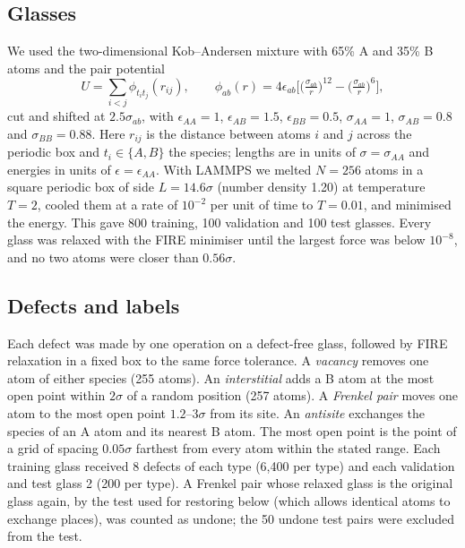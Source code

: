 \documentclass[11pt]{article}
\begin{document}
\subsection*{Glasses}
We used the two-dimensional Kob--Andersen mixture\citep{kob1995,bruning2009} with 65\% A and 35\% B atoms and the pair potential
\begin{equation}
U=\sum_{i<j}\phi_{t_it_j}(r_{ij}),\qquad \phi_{ab}(r)=4\epsilon_{ab}\Big[\big(\tfrac{\sigma_{ab}}{r}\big)^{12}-\big(\tfrac{\sigma_{ab}}{r}\big)^{6}\Big],
\label{eq:potential}
\end{equation}
cut and shifted at $2.5\sigma_{ab}$, with $\epsilon_{AA}=1$, $\epsilon_{AB}=1.5$, $\epsilon_{BB}=0.5$, $\sigma_{AA}=1$, $\sigma_{AB}=0.8$ and $\sigma_{BB}=0.88$. Here $r_{ij}$ is the distance between atoms $i$ and $j$ across the periodic box and $t_i\in\{A,B\}$ the species; lengths are in units of $\sigma=\sigma_{AA}$ and energies in units of $\epsilon=\epsilon_{AA}$. With LAMMPS\citep{thompson2022lammps} we melted $N=256$ atoms in a square periodic box of side $L=14.6\sigma$ (number density 1.20) at temperature $T=2$, cooled them at a rate of $10^{-2}$ per unit of time to $T=0.01$, and minimised the energy. This gave 800 training, 100 validation and 100 test glasses. Every glass was relaxed with the FIRE minimiser\citep{bitzek2006fire} until the largest force was below $10^{-8}$, and no two atoms were closer than $0.56\sigma$.

\subsection*{Defects and labels}
Each defect was made by one operation on a defect-free glass, followed by FIRE relaxation in a fixed box to the same force tolerance. A \emph{vacancy} removes one atom of either species (255 atoms). An \emph{interstitial} adds a B atom at the most open point within $2\sigma$ of a random position (257 atoms). A \emph{Frenkel pair} moves one atom to the most open point $1.2$--$3\sigma$ from its site. An \emph{antisite} exchanges the species of an A atom and its nearest B atom. The most open point is the point of a grid of spacing $0.05\sigma$ farthest from every atom within the stated range. Each training glass received 8 defects of each type (6,400 per type) and each validation and test glass 2 (200 per type). A Frenkel pair whose relaxed glass is the original glass again, by the test used for restoring below (which allows identical atoms to exchange places), was counted as undone; the 50 undone test pairs were excluded from the test.
\end{document}
